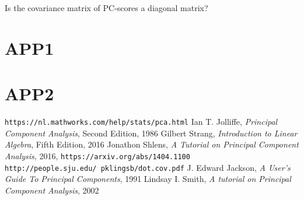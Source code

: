 \documentclass[10pt,twocolumn]{article}
\begin{document}
Is the covariance matrix of PC-scores a diagonal matrix?




\appendix

\section{APP1} \label{app:A}

\section{APP2} \label{app:B}

\thebibliography{}

 \texttt{https://nl.mathworks.com/help/stats/pca.html}
 Ian T. Jolliffe, \textit{Principal Component Analysis}, Second Edition, 1986
 Gilbert Strang, \textit{Introduction to Linear Algebra}, Fifth Edition, 2016
 Jonathon Shlens, \textit{A Tutorial on Principal Component Analysis}, 2016, \texttt{https://arxiv.org/abs/1404.1100}
 \texttt{http://people.sju.edu/~pklingsb/dot.cov.pdf}
 J. Edward Jackson, \textit{A User's Guide To Principal Components}, 1991
 Lindsay I. Smith, \textit{A tutorial on Principal Component Analysis}, 2002
\end{document}
